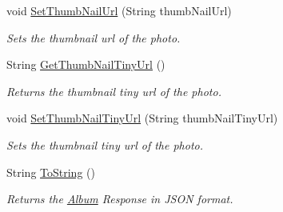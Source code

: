\begin{DoxyCompactItemize}
void \hyperlink{classcom_1_1shephertz_1_1app42_1_1paas_1_1sdk_1_1csharp_1_1gallery_1_1_album_1_1_photo_a511423c240d3885c820fcbd91583ef7b}{Set\+Thumb\+Nail\+Url} (String thumb\+Nail\+Url)
\begin{DoxyCompactList}\small\item\em Sets the thumbnail url of the photo. \end{DoxyCompactList}\item 
String \hyperlink{classcom_1_1shephertz_1_1app42_1_1paas_1_1sdk_1_1csharp_1_1gallery_1_1_album_1_1_photo_a9c34dd324a9df3acac7b070c503f0881}{Get\+Thumb\+Nail\+Tiny\+Url} ()
\begin{DoxyCompactList}\small\item\em Returns the thumbnail tiny url of the photo. \end{DoxyCompactList}\item 
void \hyperlink{classcom_1_1shephertz_1_1app42_1_1paas_1_1sdk_1_1csharp_1_1gallery_1_1_album_1_1_photo_ac71592daee99b08a282b4506527613a4}{Set\+Thumb\+Nail\+Tiny\+Url} (String thumb\+Nail\+Tiny\+Url)
\begin{DoxyCompactList}\small\item\em Sets the thumbnail tiny url of the photo. \end{DoxyCompactList}\item 
String \hyperlink{classcom_1_1shephertz_1_1app42_1_1paas_1_1sdk_1_1csharp_1_1gallery_1_1_album_1_1_photo_a8aaecc730c46396fed441ae277718a5b}{To\+String} ()
\begin{DoxyCompactList}\small\item\em Returns the \hyperlink{classcom_1_1shephertz_1_1app42_1_1paas_1_1sdk_1_1csharp_1_1gallery_1_1_album}{Album} Response in J\+S\+O\+N format. \end{DoxyCompactList}\end{DoxyCompactItemize}
